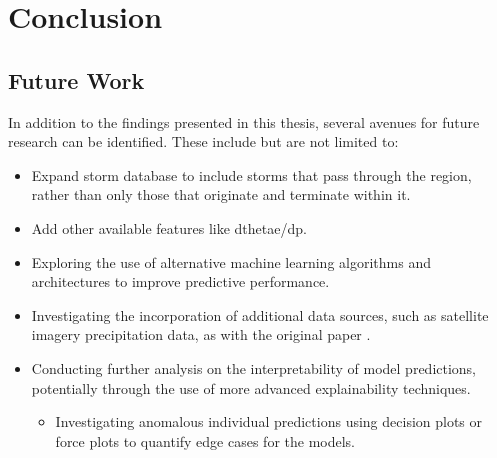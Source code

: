 \chapter{Conclusion}
\label{ch:con}

\section{Future Work}
In addition to the findings presented in this thesis, several avenues for future research can be identified. These include but are not limited to:

\begin{itemize}
    \item Expand storm database to include storms that pass through the region, rather than only those that originate and terminate within it.
    \item Add other available features like dthetae/dp.
    \item Exploring the use of alternative machine learning algorithms and architectures to improve predictive performance.
    \item Investigating the incorporation of additional data sources, such as satellite imagery precipitation data, as with the original paper \citep{Hill2023}.
    \item Conducting further analysis on the interpretability of model predictions, potentially through the use of more advanced explainability techniques.
    \begin{itemize}
        \item Investigating anomalous individual predictions using decision plots or force plots to quantify edge cases for the models.
    \end{itemize}
\end{itemize}